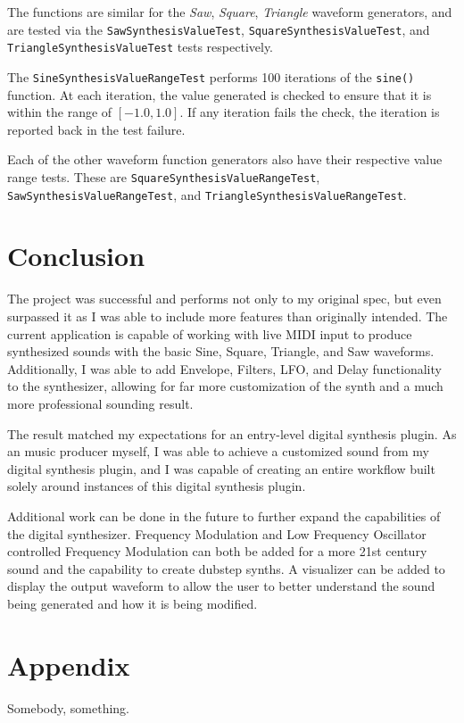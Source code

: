 \documentclass[a4paper,12pt]{report}
\begin{document}
The functions are similar for the \emph{Saw}, \emph{Square}, \emph{Triangle} waveform generators, and are tested via the \texttt{SawSynthesisValueTest}, \texttt{SquareSynthesisValueTest}, and \texttt{TriangleSynthesisValueTest} tests respectively.

The \texttt{SineSynthesisValueRangeTest} performs 100 iterations of the \texttt{sine()} function. At each iteration, the value generated is checked to ensure that it is within the range of $[-1.0,1.0]$. If any iteration fails the check, the iteration is reported back in the test failure.

Each of the other waveform function generators also have their respective value range tests. These are \texttt{SquareSynthesisValueRangeTest}, \texttt{SawSynthesisValueRangeTest}, and \texttt{TriangleSynthesisValueRangeTest}.

\chapter{Conclusion}
\label{chapter:results}
The project was successful and performs not only to my original spec, but even surpassed it as I was able to include more features than originally intended. The current application is capable of working with live MIDI input to produce synthesized sounds with the basic Sine, Square, Triangle, and Saw waveforms. Additionally, I was able to add Envelope, Filters, LFO, and Delay functionality to the synthesizer, allowing for far more customization of the synth and a much more professional sounding result. 

The result matched my expectations for an entry-level digital synthesis plugin. As an music producer myself, I was able to achieve a customized sound from my digital synthesis plugin, and I was capable of creating an entire workflow built solely around instances of this digital synthesis plugin.

Additional work can be done in the future to further expand the capabilities of the digital synthesizer. Frequency Modulation and Low Frequency Oscillator controlled Frequency Modulation can both be added for a more 21st century sound and the capability to create dubstep synths. A visualizer can be added to display the output waveform to allow the user to better understand the sound being generated and how it is being modified.
\chapter{Appendix}

\begin{thebibliography}{9}
 Somebody, something.
\end{thebibliography}

\cleardoublepage
\listoffigures
\cleardoublepage
{}
\lstlistoflistings
\end{document}
